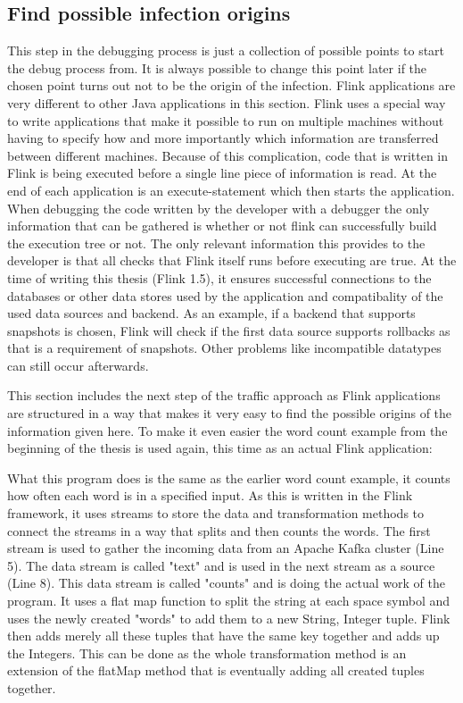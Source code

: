 \subsection{Find possible infection origins}
This step in the debugging process is just a collection of possible points to start the debug process from. It is always possible to change this point later if the chosen point turns out not to be the origin of the infection. Flink applications are very different to other Java applications in this section. Flink uses a special way to write applications that make it possible to run on multiple machines without having to specify how and more importantly which information are transferred between different machines. Because of this complication, code that is written in Flink is being executed before a single line piece of information is read. At the end of each application is an execute-statement which then starts the application. When debugging the code written by the developer with a debugger the only information that can be gathered is whether or not flink can successfully build the execution tree or not. The only relevant information this provides to the developer is that all checks that Flink itself runs before executing are true. At the time of writing this thesis (Flink 1.5), it ensures successful connections to the databases or other data stores used by the application and compatibality of the used data sources and backend. As an example, if a backend that supports snapshots is chosen, Flink will check if the first data source supports rollbacks as that is a requirement of snapshots. Other problems like incompatible datatypes can still occur afterwards.

This section includes the next step of the traffic approach as Flink applications are structured in a way that makes it very easy to find the possible origins of the information given here. To make it even easier the word count example from the beginning of the thesis is used again, this time as an actual Flink application:



What this program does is the same as the earlier word count example, it counts how often each word is in a specified input. As this is written in the Flink framework, it uses streams to store the data and transformation methods to connect the streams in a way that splits and then counts the words. The first stream is used to gather the incoming data from an Apache Kafka cluster (Line 5). The data stream is called "text" and is used in the next stream as a source (Line 8). This data stream is called "counts" and is doing the actual work of the program. It uses a flat map function to split the string at each space symbol and uses the newly created "words" to add them to a new String, Integer tuple. Flink then adds merely all these tuples that have the same key together and adds up the Integers. This can be done as the whole transformation method is an extension of the flatMap method that is eventually adding all created tuples together.

